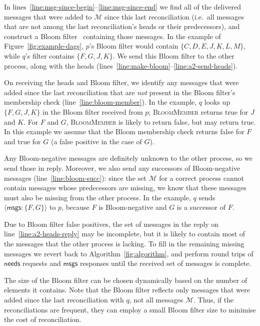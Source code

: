 \documentclass[a4paper,anonymous,USenglish]{lipics-v2019}
\begin{document}
In lines~\ref{line:msg-since-begin}--\ref{line:msg-since-end} we find all of the delivered messages that were added to $\mathcal{M}$ since this last reconciliation (i.e.\ all messages that are not among the last reconciliation's heads or their predecessors), and construct a Bloom filter~\cite{Bloom:1970} containing those messages.
In the example of Figure~\ref{fig:example-dags}, $p$'s Bloom filter would contain $\{C, D, E, J, K, L, M\}$, while $q$'s filter contains $\{F, G, J, K\}$.
We send this Bloom filter to the other process, along with the heads (lines~\ref{line:make-bloom}--\ref{line:a2-send-heads}).

On receiving the heads and Bloom filter, we identify any messages that were added since the last reconciliation that are \emph{not} present in the Bloom filter's membership check (line~\ref{line:bloom-member}).
In the example, $q$ looks up $\{F, G, J, K\}$ in the Bloom filter received from $p$; \textsc{BloomMember} returns true for $J$ and $K$. For $F$ and $G$, \textsc{BloomMember} is likely to return false, but may return true.
In this example we assume that the Bloom membership check returns false for $F$ and true for $G$ (a false positive in the case of $G$).

Any Bloom-negative messages are definitely unknown to the other process, so we send those in reply.
Moreover, we also send any successors of Bloom-negative messages (line~\ref{line:bloom-succ}): since the set $\mathcal{M}$ for a correct process cannot contain messages whose predecessors are missing, we know that these messages must also be missing from the other process.
In the example, $q$ sends $\langle\mathsf{msgs}: \{F, G\}\rangle$ to $p$, because $F$ is Bloom-negative and $G$ is a successor of $F$.

Due to Bloom filter false positives, the set of messages in the reply on line~\ref{line:a2-heads-reply} may be incomplete, but it is likely to contain most of the messages that the other process is lacking.
To fill in the remaining missing messages we revert back to Algorithm~\ref{fig:algorithm}, and perform round trips of $\mathsf{needs}$ requests and $\mathsf{msgs}$ responses until the received set of messages is complete.

The size of the Bloom filter can be chosen dynamically based on the number of elements it contains.
Note that the Bloom filter reflects only messages that were added since the last reconciliation with $q$, not all messages $\mathcal{M}$.
Thus, if the reconciliations are frequent, they can employ a small Bloom filter size to minimise the cost of reconciliation.
\end{document}
